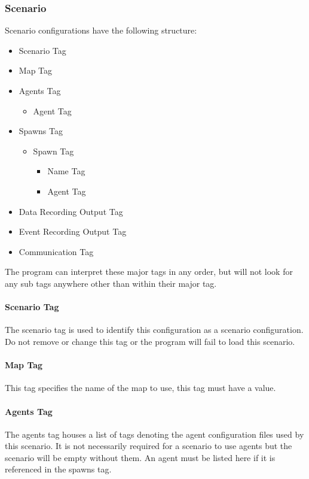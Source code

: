\documentclass[../main.tex]{subfiles}
\begin{document}
\subsubsection{Scenario}
Scenario configurations have the following structure:
\begin{itemize}
	\item Scenario Tag
	\item Map Tag
	\item Agents Tag
	\begin{itemize}
        \item Agent Tag
    \end{itemize}
	\item Spawns Tag
	\begin{itemize}
        \item Spawn Tag
        \begin{itemize}
            \item Name Tag
            \item Agent Tag
        \end{itemize}
    \end{itemize}
	\item Data Recording Output Tag
	\item Event Recording Output Tag
	\item Communication Tag
\end{itemize}

The program can interpret these major tags in any order, but will not look for any sub tags anywhere other than within their major tag.

\paragraph{Scenario Tag}
The scenario tag is used to identify this configuration as a scenario configuration.
Do not remove or change this tag or the program will fail to load this scenario.

\paragraph{Map Tag}
This tag specifies the name of the map to use, this tag must have a value.

\paragraph{Agents Tag}
The agents tag houses a list of tags denoting the agent configuration files used by this scenario.
It is not necessarily required for a scenario to use agents but the scenario will be empty without them.
An agent must be listed here if it is referenced in the spawns tag.
\end{document}
